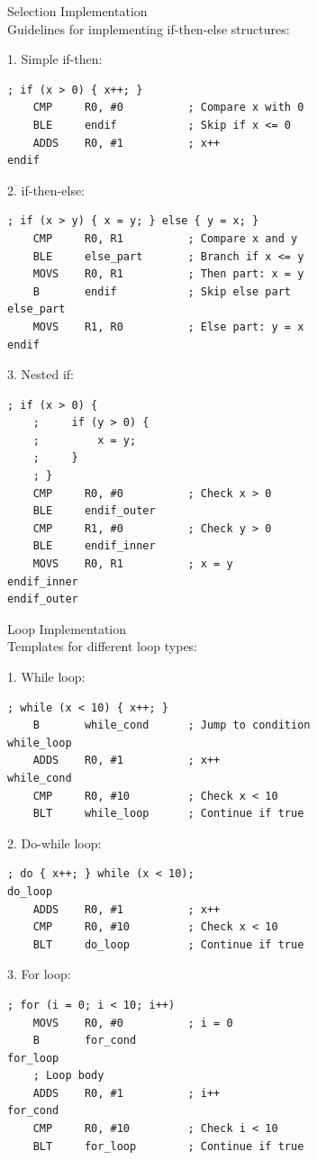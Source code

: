 \begin{KR}{Selection Implementation}\\
Guidelines for implementing if-then-else structures:

1. Simple if-then:
\begin{lstlisting}[language=armasm, style=base]
    ; if (x > 0) { x++; }
    CMP     R0, #0          ; Compare x with 0
    BLE     endif           ; Skip if x <= 0
    ADDS    R0, #1          ; x++
endif
\end{lstlisting}

2. if-then-else:
\begin{lstlisting}[language=armasm, style=base]
    ; if (x > y) { x = y; } else { y = x; }
    CMP     R0, R1          ; Compare x and y
    BLE     else_part       ; Branch if x <= y
    MOVS    R0, R1          ; Then part: x = y
    B       endif           ; Skip else part
else_part
    MOVS    R1, R0          ; Else part: y = x
endif
\end{lstlisting}

3. Nested if:
\begin{lstlisting}[language=armasm, style=base]
    ; if (x > 0) {
    ;     if (y > 0) {
    ;         x = y;
    ;     }
    ; }
    CMP     R0, #0          ; Check x > 0
    BLE     endif_outer
    CMP     R1, #0          ; Check y > 0
    BLE     endif_inner
    MOVS    R0, R1          ; x = y
endif_inner
endif_outer
\end{lstlisting}
\end{KR}

\begin{KR}{Loop Implementation}\\
Templates for different loop types:

1. While loop:
\begin{lstlisting}[language=armasm, style=base]
    ; while (x < 10) { x++; }
    B       while_cond      ; Jump to condition
while_loop
    ADDS    R0, #1          ; x++
while_cond
    CMP     R0, #10         ; Check x < 10
    BLT     while_loop      ; Continue if true
\end{lstlisting}

2. Do-while loop:
\begin{lstlisting}[language=armasm, style=base]
    ; do { x++; } while (x < 10);
do_loop
    ADDS    R0, #1          ; x++
    CMP     R0, #10         ; Check x < 10
    BLT     do_loop         ; Continue if true
\end{lstlisting}

3. For loop:
\begin{lstlisting}[language=armasm, style=base]
    ; for (i = 0; i < 10; i++)
    MOVS    R0, #0          ; i = 0
    B       for_cond
for_loop
    ; Loop body
    ADDS    R0, #1          ; i++
for_cond
    CMP     R0, #10         ; Check i < 10
    BLT     for_loop        ; Continue if true
\end{lstlisting}
\end{KR}

